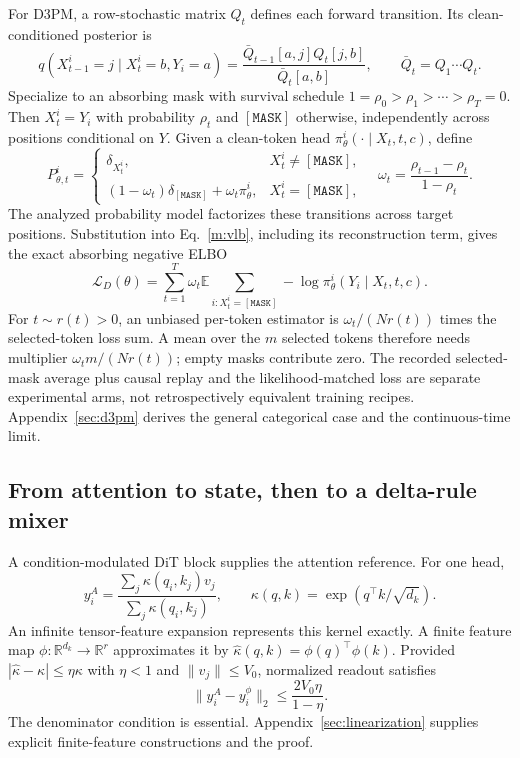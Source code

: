 \documentclass{article}
\theoremstyle{remark}\newtheorem{remark}[theorem]{Remark}
\newcommand{\R}{\mathbb R}
\newcommand{\E}{\mathbb E}
\newcommand{\mask}{\mathtt{[MASK]}}
\begin{document}
For D3PM, a row-stochastic matrix $Q_t$ defines each forward transition. Its clean-conditioned posterior is
\begin{equation}
q(X_{t-1}^i=j\mid X_t^i=b,Y_i=a)
=\frac{\bar Q_{t-1}[a,j]Q_t[j,b]}{\bar Q_t[a,b]},
\qquad \bar Q_t=Q_1\cdots Q_t.
\label{m:d3pm}
\end{equation}
Specialize to an absorbing mask with survival schedule $1=\rho_0>\rho_1>\cdots>\rho_T=0$. Then $X_t^i=Y_i$ with probability $\rho_t$ and $\mask$ otherwise, independently across positions conditional on $Y$. Given a clean-token head $\pi_\theta^i(\cdot\mid X_t,t,c)$, define
\begin{equation}
P_{\theta,t}^i=\begin{cases}
\delta_{X_t^i},&X_t^i\ne\mask,\\
(1-\omega_t)\delta_{\mask}+\omega_t\pi_\theta^i,&X_t^i=\mask,
\end{cases}
\quad
\omega_t=\frac{\rho_{t-1}-\rho_t}{1-\rho_t}.
\label{m:reverse}
\end{equation}
The analyzed probability model factorizes these transitions across target positions. Substitution into Eq.~\eqref{m:vlb}, including its reconstruction term, gives the exact absorbing negative ELBO
\begin{equation}
\boxed{\mathcal L_D(\theta)=\sum_{t=1}^{T}\omega_t\E\sum_{i:X_t^i=\mask}-\log\pi_\theta^i(Y_i\mid X_t,t,c).}
\label{m:loss}
\end{equation}
For $t\sim r(t)>0$, an unbiased per-token estimator is $\omega_t/(Nr(t))$ times the selected-token loss sum. A mean over the $m$ selected tokens therefore needs multiplier $\omega_t m/(Nr(t))$; empty masks contribute zero. The recorded selected-mask average plus causal replay and the likelihood-matched loss are separate experimental arms, not retrospectively equivalent training recipes. Appendix~\ref{sec:d3pm} derives the general categorical case and the continuous-time limit.

\subsection{From attention to state, then to a delta-rule mixer}
A condition-modulated DiT block supplies the attention reference. For one head,
\begin{equation}
y_i^A=\frac{\sum_j\kappa(q_i,k_j)v_j}{\sum_j\kappa(q_i,k_j)},
\qquad \kappa(q,k)=\exp(q^\top k/\sqrt{d_k}).
\label{m:attn}
\end{equation}
An infinite tensor-feature expansion represents this kernel exactly. A finite feature map $\phi:\R^{d_k}\to\R^r$ approximates it by $\widehat\kappa(q,k)=\phi(q)^\top\phi(k)$. Provided $|\widehat\kappa-\kappa|\le\eta\kappa$ with $\eta<1$ and $\|v_j\|\le V_0$, normalized readout satisfies
\begin{equation}
\|y_i^A-y_i^\phi\|_2\le\frac{2V_0\eta}{1-\eta}.
\label{m:kernelbound}
\end{equation}
The denominator condition is essential. Appendix~\ref{sec:linearization} supplies explicit finite-feature constructions and the proof.
\end{document}

